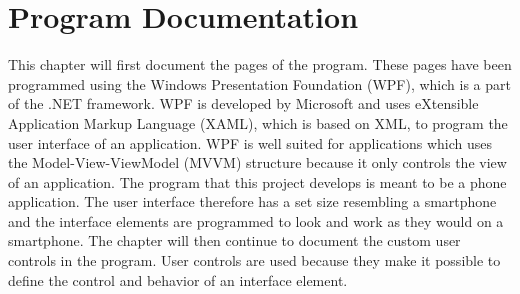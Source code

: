 \chapter{Program Documentation}
This chapter will first document the pages of the program. These pages have been programmed using the Windows Presentation Foundation (WPF), which is a part of the .NET framework. WPF is developed by Microsoft and uses eXtensible Application Markup Language (XAML), which is based on XML, to program the user interface of an application. WPF is well suited for applications which uses the Model-View-ViewModel (MVVM) structure because it only controls the view of an application. The program that this project develops is meant to be a phone application. The user interface therefore has a set size resembling a smartphone and the interface elements are programmed to look and work as they would on a smartphone. The chapter will then continue to document the custom user controls in the program. User controls are used because they make it possible to define the control and behavior of an interface element. 